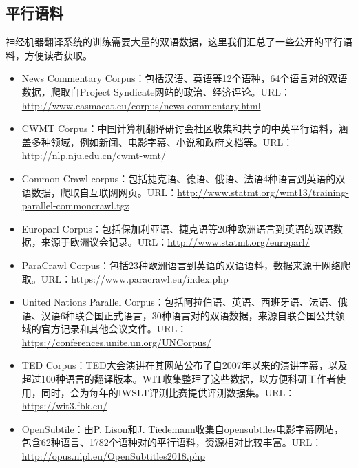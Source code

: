 \begin{appendices}

\section{平行语料}
\parinterval 神经机器翻译系统的训练需要大量的双语数据，这里我们汇总了一些公开的平行语料，方便读者获取。
\vspace{0.5em}
\begin{itemize}
\item News Commentary Corpus：包括汉语、英语等12个语种，64个语言对的双语数据，爬取自Project Syndicate网站的政治、经济评论。URL：\url{http://www.casmacat.eu/corpus/news-commentary.html}
\vspace{0.5em}
\item CWMT Corpus：中国计算机翻译研讨会社区收集和共享的中英平行语料，涵盖多种领域，例如新闻、电影字幕、小说和政府文档等。URL：\url{http://nlp.nju.edu.cn/cwmt-wmt/}
\vspace{0.5em}
\item Common Crawl corpus：包括捷克语、德语、俄语、法语4种语言到英语的双语数据，爬取自互联网网页。URL：\url{http://www.statmt.org/wmt13/training-parallel-commoncrawl.tgz}
\vspace{0.5em}
\item Europarl Corpus：包括保加利亚语、捷克语等20种欧洲语言到英语的双语数据，来源于欧洲议会记录。URL：\url{http://www.statmt.org/europarl/}
\vspace{0.5em}
\item ParaCrawl Corpus：包括23种欧洲语言到英语的双语语料，数据来源于网络爬取。URL：\url{https://www.paracrawl.eu/index.php}
\vspace{0.5em}
\item United Nations Parallel Corpus：包括阿拉伯语、英语、西班牙语、法语、俄语、汉语6种联合国正式语言，30种语言对的双语数据，来源自联合国公共领域的官方记录和其他会议文件。URL：\url{https://conferences.unite.un.org/UNCorpus/}
\vspace{0.5em}
\item TED Corpus：TED大会演讲在其网站公布了自2007年以来的演讲字幕，以及超过100种语言的翻译版本。WIT收集整理了这些数据，以方便科研工作者使用，同时，会为每年的IWSLT评测比赛提供评测数据集。URL：\url{https://wit3.fbk.eu/}
\vspace{0.5em}
\item OpenSubtile：由P. Lison和J. Tiedemann收集自opensubtiles电影字幕网站，包含62种语言、1782个语种对的平行语料，资源相对比较丰富。URL：\url{http://opus.nlpl.eu/OpenSubtitles2018.php}

\end{itemize}
\end{appendices}
